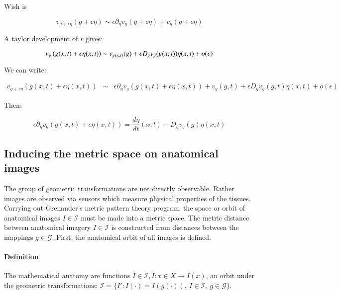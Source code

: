\documentclass[preprint,review,8pt,times]{elsarticle}
\begin{document}
{Wish is

$$
v_{g + \epsilon \eta}(g + \epsilon \eta) \sim \epsilon \partial_{\eta} v_{g} (g + \epsilon \eta) + v_{g}(g + \epsilon \eta)
$$

A taylor development of $v$ gives:

$$
v_{g} \left( g(x,t) + \epsilon \eta(x,t) \right) \sim v_{g(x,t)}(g) + \epsilon D_{g} v_{g}(g(x,t)) \eta(x,t) + o(\epsilon) \\
$$

We can write:

\begin{eqnarray*}
v_{g + \epsilon \eta} \left( g(x,t) + \epsilon \eta(x,t) \right) & \sim & \epsilon \partial_{\eta} v_{g} \left( g(x,t) + \epsilon \eta(x,t) \right) + v_{g}(g,t) + \epsilon D_{g} v_{g}(g,t) \eta(x,t) + o(\epsilon)
\end{eqnarray*}

Then:

$$
\epsilon \partial_{\eta} v_{g}  \left( g(x,t) + \epsilon \eta(x,t) \right) = \frac{d \eta}{d t}(x,t) - D_{g}v_{g}(g) \eta(x,t)
$$
}




\subsection{Inducing the metric space on anatomical images}

The group of geometric transformations are not directly observable. Rather images are observed via sensors which measure physical properties of the tissues. Carrying out Grenander's metric pattern theory program, the space or orbit of anatomical images $I \in \mathcal{I}$ must be made into a metric space. The metric distance between anatomical imagery $I \in \mathcal{I}$ is constructed from distances between the mappings $g \in \mathcal{G}$. First, the anatomical orbit of all images is defined.

\paragraph{Definition}{The mathematical anatomy are functions $I \in \mathcal{I}, I: x \in X \rightarrow I(x)$, an orbit under the geometric transformations: $\mathcal{I} = \lbrace I':I(\cdot) = I(g(\cdot)),~I \in \mathcal{I},~g \in \mathcal{G} \rbrace$.\\}
\end{document}
